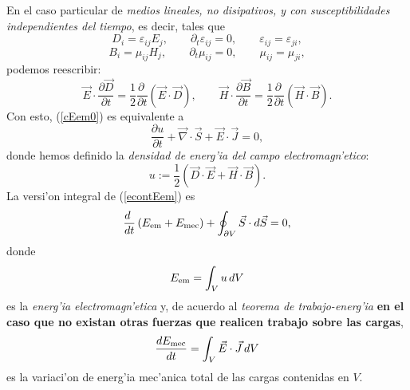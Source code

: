 En el caso particular de \textit{medios lineales, no disipativos, y con susceptibilidades
independientes del tiempo}, es decir, tales que
\begin{equation}
D_i=\varepsilon_{ij}E_j, \qquad \partial_t\varepsilon_{ij}=0, \qquad \varepsilon_{ij}=\varepsilon_{ji},
\end{equation}
\begin{equation}
B_i=\mu_{ij}H_j, \qquad \partial_t\mu_{ij}=0, \qquad \mu_{ij}=\mu_{ji},
\end{equation}
podemos reescribir:
\begin{equation}
 \vec{E}\cdot\frac{\partial \vec{D}}{\partial
t}=\frac{1}{2}\frac{\partial\ }{\partial t}\left(\vec{E}\cdot\vec{D}\right),
\qquad
 \vec{H}\cdot\frac{\partial \vec{B}}{\partial
t}=\frac{1}{2}\frac{\partial\ }{\partial t}\left(\vec{H}\cdot\vec{B}\right).
\end{equation}
Con esto, (\ref{cEem0}) es equivalente a
\begin{equation}
\boxed{\frac{\partial u}{\partial
t}+\vec\nabla\cdot\vec{S}+\vec{E}\cdot\vec{J}=0 ,} \label{econtEem}
\end{equation}
donde hemos definido la \textit{densidad de energ'ia del campo
electromagn'etico}:
\begin{equation}\label{uDEHB}
\boxed{u:=\frac{1}{2}\left(\vec{D}\cdot\vec{E}+\vec{H}\cdot\vec{B}\right).}
\end{equation}
La versi'on integral de (\ref{econtEem}) es
\begin{equation}
\frac{d\ }{dt}\left(E_{\rm em}+E_{\rm mec}\right)+\oint_{\partial
V}\vec{S}\cdot d\vec{S}=0 ,
\end{equation}
donde
\begin{equation}
E_{\rm em}=\int_V u\,dV
\end{equation}
es la \textit{energ'ia electromagn'etica} y, de acuerdo al \textit{teorema de trabajo-energ'ia} \textbf{en el caso que no existan otras fuerzas que realicen trabajo sobre las cargas},
\begin{equation}
 \frac{dE_{\rm mec}}{dt}=\int_V\vec{E}\cdot\vec{J}\,dV
\end{equation}
es la variaci'on de energ'ia mec'anica total de las cargas contenidas en $V$.

